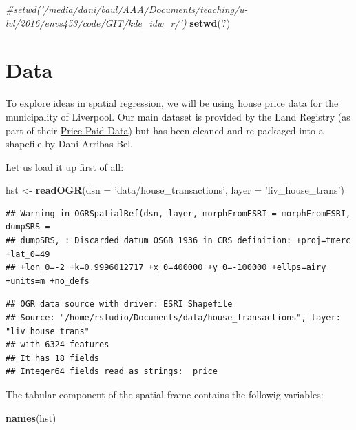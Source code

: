 \documentclass[
]{book}
\newenvironment{Shaded}{\begin{snugshade}}{\end{snugshade}}
\newcommand{\CommentTok}[1]{\textcolor[rgb]{0.56,0.35,0.01}{\textit{#1}}}
\newcommand{\DataTypeTok}[1]{\textcolor[rgb]{0.13,0.29,0.53}{#1}}
\newcommand{\KeywordTok}[1]{\textcolor[rgb]{0.13,0.29,0.53}{\textbf{#1}}}
\newcommand{\NormalTok}[1]{#1}
\newcommand{\StringTok}[1]{\textcolor[rgb]{0.31,0.60,0.02}{#1}}
\begin{document}
\begin{Shaded}
\begin{Highlighting}[]
\CommentTok{#setwd('/media/dani/baul/AAA/Documents/teaching/u-lvl/2016/envs453/code/GIT/kde_idw_r/')}
\KeywordTok{setwd}\NormalTok{(}\StringTok{'.'}\NormalTok{)}
\end{Highlighting}
\end{Shaded}

\hypertarget{data-2}{%
\section{Data}\label{data-2}}

To explore ideas in spatial regression, we will be using house price data for the municipality of Liverpool. Our main dataset is provided by the Land Registry (as part of their \href{https://www.gov.uk/government/collections/price-paid-data}{Price Paid Data}) but has been cleaned and re-packaged into a shapefile by Dani Arribas-Bel.

Let us load it up first of all:

\begin{Shaded}
\begin{Highlighting}[]
\NormalTok{hst <-}\StringTok{ }\KeywordTok{readOGR}\NormalTok{(}\DataTypeTok{dsn =} \StringTok{'data/house_transactions'}\NormalTok{, }\DataTypeTok{layer =} \StringTok{'liv_house_trans'}\NormalTok{)}
\end{Highlighting}
\end{Shaded}

\begin{verbatim}
## Warning in OGRSpatialRef(dsn, layer, morphFromESRI = morphFromESRI, dumpSRS =
## dumpSRS, : Discarded datum OSGB_1936 in CRS definition: +proj=tmerc +lat_0=49
## +lon_0=-2 +k=0.9996012717 +x_0=400000 +y_0=-100000 +ellps=airy +units=m +no_defs
\end{verbatim}

\begin{verbatim}
## OGR data source with driver: ESRI Shapefile 
## Source: "/home/rstudio/Documents/data/house_transactions", layer: "liv_house_trans"
## with 6324 features
## It has 18 fields
## Integer64 fields read as strings:  price
\end{verbatim}

The tabular component of the spatial frame contains the followig variables:

\begin{Shaded}
\begin{Highlighting}[]
\KeywordTok{names}\NormalTok{(hst)}
\end{Highlighting}
\end{Shaded}
\end{document}
